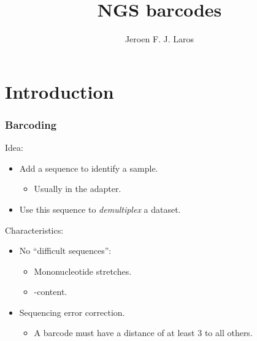 \documentclass[slidestop]{beamer}
\title{NGS barcodes}
\author{Jeroen F. J. Laros}
\begin{document}

\bodytemplate

\section{Introduction}
\begin{frame}
  \frametitle{Barcoding}

  Idea:
  \begin{itemize}
    \item Add a sequence to identify a sample.
    \begin{itemize}
      \item Usually in the adapter.
    \end{itemize}
    \item Use this sequence to \emph{demultiplex} a dataset.
  \end{itemize}
  \bigskip
  \pause

  Characteristics:
  \begin{itemize}
    \item No ``difficult sequences'':
    \begin{itemize}
      \item Mononucleotide stretches.
      \item {}-content.
    \end{itemize}
    \item Sequencing error correction.
    \begin{itemize}
      \item A barcode must have a distance of at least $3$ to all others.
    \end{itemize}
  \end{itemize}
\end{frame}
\end{document}
